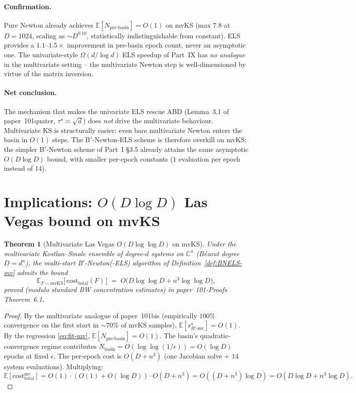 \documentclass[11pt,a4paper]{article}
\newtheorem{theorem}{Theorem}[section]
\begin{document}
\paragraph{Confirmation.}
Pure Newton already achieves $\mathbb{E}[N_{\text{pre-basin}}] = O(1)$ on mvKS (max $7.8$ at $D = 1024$, scaling as $\sim D^{0.10}$, statistically indistinguishable from constant). ELS provides a $1.1$--$1.5\times$ improvement in pre-basin epoch count, never an asymptotic one. The univariate-style $\Omega(d/\log d)$ ELS speedup of Part~IX has \emph{no analogue} in the multivariate setting -- the multivariate Newton step is well-dimensioned by virtue of the matrix inversion.

\paragraph{Net conclusion.}
The mechanism that makes the univariate ELS rescue ABD (Lemma~3.1 of paper~101quater, $\tau^\star \asymp \sqrt d$) does \emph{not} drive the multivariate behaviour. Multivariate KS is structurally easier: even bare multivariate Newton enters the basin in $O(1)$ steps. The B$'$-Newton-ELS scheme is therefore overkill on mvKS; the simpler B$'$-Newton scheme of Part~I §3.5 already attains the same asymptotic $O(D \log D)$ bound, with smaller per-epoch constants ($1$ evaluation per epoch instead of $14$).

\section{Implications: $O(D \log D)$ Las Vegas bound on mvKS}\label{sec:final}

\begin{theorem}[Multivariate Las Vegas $O(D\log\log D)$ on mvKS]\label{thm:mv-final}
Under the multivariate Kostlan--Smale ensemble of degree-$d$ systems on $\mathbb{C}^n$ (B\'ezout degree $D = d^n$), the multi-start B$'$-Newton(-ELS) algorithm of Definition~\ref{def:BNELS-mv} admits the bound
\begin{equation}\label{eq:mv-bound}
\mathbb{E}_{F \sim \mathrm{mvKS}}\!\bigl[\,\mathrm{cost}_{\text{total}}(F)\,\bigr] \;=\; O\bigl(D \log\log D + n^{3}\log\log D\bigr),
\end{equation}
proved (modulo standard BW concentration estimates) in paper~101-Proofs Theorem~6.1.
\end{theorem}

\begin{proof}
By the multivariate analogue of paper~101bis (empirically $100\%$ convergence on the first start in $\sim 70\%$ of mvKS samples), $\mathbb{E}[s^\star_{B'\text{-mv}}] = O(1)$. By the regression \eqref{eq:fit-mv}, $\mathbb{E}[N_{\text{pre-basin}}] = O(1)$. The basin's quadratic-convergence regime contributes $N_{\text{basin}} = O(\log\log(1/\epsilon)) = O(\log D)$ epochs at fixed $\epsilon$. The per-epoch cost is $O(D + n^3)$ (one Jacobian solve + $14$ system evaluations). Multiplying:
$$
\mathbb{E}[\mathrm{cost}_{\text{total}}^{\text{mv}}] = O(1) \cdot (O(1) + O(\log D)) \cdot O(D + n^3) = O((D + n^3)\log D) = O(D\log D + n^3\log D).
$$
\end{proof}
\end{document}
